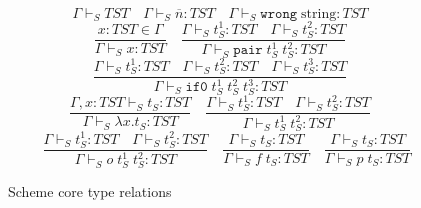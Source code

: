 \begin{figure}
\[
\Gamma\vdash_{S}TST
\quad
\Gamma\vdash_{S}\overline{n}:TST
\quad
\Gamma\vdash_{S}\mathtt{wrong}\;\mathrm{string}:TST
\]
\[
\frac{x:TST\in\Gamma}{\Gamma\vdash_{S}x:TST}
\quad
\frac{\Gamma\vdash_{S}t_{S}^{1}:TST\quad\Gamma\vdash_{S}t_{S}^{2}:TST}{\Gamma\vdash_{S}\mathtt{pair}\;t_{S}^{1}\;t_{S}^{2}:TST}
\]
\[
\frac{\Gamma\vdash_{S}t_{S}^{1}:TST\quad\Gamma\vdash_{S}t_{S}^{2}:TST\quad\Gamma\vdash_{S}t_{S}^{3}:TST}{\Gamma\vdash_{S}\mathtt{if0}\;t_{S}^{1}\;t_{S}^{2}\;t_{S}^{3}:TST}
\]
\[
\frac{\Gamma,x:TST\vdash_{S}t_{S}:TST}{\Gamma\vdash_{S}\lambda x.t_{S}:TST}
\quad
\frac{\Gamma\vdash_{S}t_{S}^{1}:TST\quad\Gamma\vdash_{S}t_{S}^{2}:TST}{\Gamma\vdash_{S}t_{S}^{1}\;t_{S}^{2}:TST}
\]
\[
\quad
\frac{\Gamma\vdash_{S}t_{S}^{1}:TST\quad\Gamma\vdash_{S}t_{S}^{2}:TST}{\Gamma\vdash_{S}o\;t_{S}^{1}\;t_{S}^{2}:TST}
\quad
\frac{\Gamma\vdash_{S}t_{S}:TST}{\Gamma\vdash_{S}f\;t_{S}:TST}
\quad
\frac{\Gamma\vdash_{S}t_{S}:TST}{\Gamma\vdash_{S}p\;t_{S}:TST}
\]
\caption{Scheme core type relations}
\label{sctr}
\end{figure}